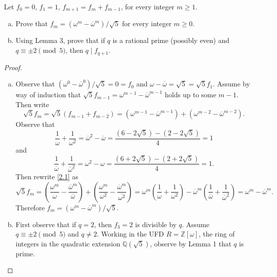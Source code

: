 \documentclass[10pt]{amsart}
\begin{document}
\begin{thm}
  Let $f_0 = 0$, $f_1 = 1$, $f_{m+1} = f_m + f_{m-1}$, for every integer $m \geq 1$.
  \begin{enumerate}[(a)]
  \item
    Prove that $f_m = (\omega^m - \overline{\omega}^m)/\sqrt{5}$ for every integer $m \geq 0$.
  \item
    Using Lemma 3, prove that if $q$ is a rational prime (possibly even) and $q \equiv \pm 2 \pmod{5}$, then $q \mid f_{q+1}$.
  \end{enumerate}
  \begin{proof}
    \begin{enumerate}[(a)]
    \item
      Observe that $(\omega^0 - \overline{\omega}^0)/\sqrt{5} = 0 = f_0$ and $\omega - \overline{\omega} = \sqrt{5} = \sqrt{5}f_1$.
      Assume by way of induction that $\sqrt{5}f_{m-1} = \omega^{m-1} - \overline{\omega}^{m-1}$ holds up to some $m-1$.
      Then write 
      \begin{equation}\label{2.1}
	\sqrt{5}f_m = \sqrt{5}(f_{m-1} + f_{m-2}) = (\omega^{m-1} - \overline{\omega}^{m-1}) + (\omega^{m-2} - \overline{\omega}^{m-2}).
      \end{equation}
      Observe that $$\frac{1}{\omega} + \frac{1}{\omega^2} = \overline{\omega}^2 - \overline{\omega} = \frac{(6 - 2\sqrt{5}) - (2 - 2\sqrt{5})}{4} = 1$$
      and
      $$\frac{1}{\overline{\omega}} + \frac{1}{\overline{\omega}^2} = \omega^2 - \omega = \frac{(6 + 2\sqrt{5}) - (2 + 2\sqrt{5})}{4} = 1.$$
      Then rewrite \eqref{2.1} as 
      \begin{equation}\label{2.2}
	\sqrt{5}f_m = \left(\frac{\omega^m}{\omega} - \frac{\overline{\omega}^m}{\overline{\omega}}\right) + \left(\frac{\omega^m}{\omega^2} - \frac{\overline{\omega}^m}{\overline{\omega^2}}\right) = \omega^m\left(\frac{1}{\omega} + \frac{1}{\omega^2}\right) - \overline{\omega}^m\left(\frac{1}{\overline{\omega}} + \frac{1}{\overline{\omega}^2}\right) = \omega^m - \overline{\omega}^m.
      \end{equation}
      Therefore $f_m = (\omega^m - \overline{\omega}^m)/\sqrt{5}$.
    \item
      First observe that if $q = 2$, then $f_3 = 2$ is divisible by $q$.
      Assume $q \equiv \pm2 \pmod{5}$ and $q \not = 2$.
      Working in the UFD $R = \mathbb{Z}[\omega]$, the ring of integers in the quadratic extension $\mathbb{Q}(\sqrt{5})$, observe by Lemma 1 that $q$ is prime.

\end{enumerate}
\end{proof}
\end{thm}
\end{document}
